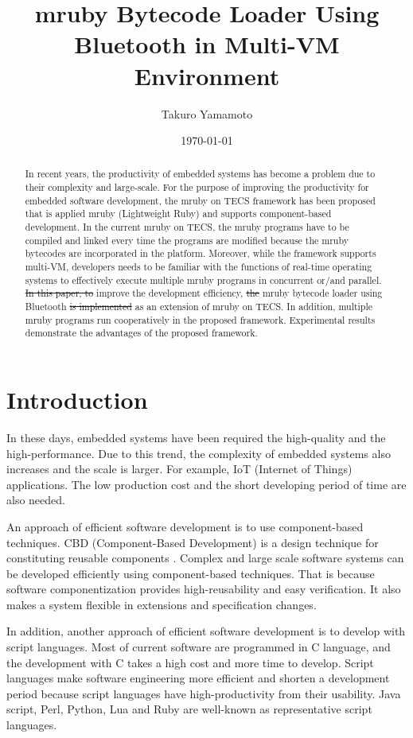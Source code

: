 \documentclass[conference,compsoc]{IEEEtran}
\title{mruby Bytecode Loader Using Bluetooth in Multi-VM Environment}
\author{Takuro Yamamoto}
\date{\today}
\providecommand{\DIFadd}[1]{{\protect\color{blue}\uwave{#1}}} %
\providecommand{\DIFdel}[1]{{\protect\color{red}\sout{#1}}}                      %
\providecommand{\DIFaddbegin}{} %
\providecommand{\DIFaddend}{} %
\providecommand{\DIFdelbegin}{} %
\providecommand{\DIFdelend}{} %
\begin{document}
\maketitle
\begin{abstract}
In recent years, the productivity of embedded systems has become a problem due to their complexity and large-scale.
For the purpose of improving the productivity for embedded software development, the mruby on TECS framework has been proposed that is applied mruby (Lightweight Ruby) and supports component-based development.
In the current mruby on TECS, the mruby programs have to be compiled and linked every time the programs are modified because the mruby bytecodes are incorporated in the platform.
Moreover, while the framework supports multi-VM, developers needs to be familiar with the functions of real-time operating systems to effectively execute multiple mruby programs in concurrent or/and parallel.
\DIFdelbegin \DIFdel{In this paper, to }\DIFdelend \DIFaddbegin \DIFadd{To }\DIFaddend improve the development efficiency, \DIFdelbegin \DIFdel{the }\DIFdelend \DIFaddbegin \DIFadd{this paper proposes an }\DIFaddend mruby bytecode loader using Bluetooth \DIFdelbegin \DIFdel{is implemented }\DIFdelend as an extension of mruby on TECS.
In addition, multiple mruby programs run cooperatively in the proposed framework.
Experimental results demonstrate the advantages of the proposed framework.
\end{abstract}
\section{Introduction}
In these days, embedded systems have been required the high-quality and the high-performance.
Due to this trend, the complexity of embedded systems also increases and the scale is larger.
For example, IoT (Internet of Things) applications.
The low production cost and the short developing period of time are also needed.

An approach of efficient software development is to use component-based techniques.
CBD (Component-Based Development) is a design technique for constituting reusable components \cite{Crnkovic:2005:CSE:1062455.1062631}.
Complex and large scale software systems can be developed efficiently using component-based techniques.
That is because software componentization provides high-reusability and easy verification.
It also makes a system flexible in extensions and specification changes.

In addition, another approach of efficient software development is to develop with script languages.
Most of current software are programmed in C language, and the development with C takes a high cost and more time to develop.
Script languages make software engineering more efficient and shorten a development period because script languages have high-productivity from their usability.
Java script, Perl, Python, Lua and Ruby are well-known as representative script languages.
\end{document}
